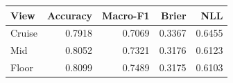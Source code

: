 \begin{tabular}{lrrrr}
\toprule
View & Accuracy & Macro-F1 & Brier & NLL \\
\midrule
Cruise & 0.7918 & 0.7069 & 0.3367 & 0.6455 \\
Mid & 0.8052 & 0.7321 & 0.3176 & 0.6123 \\
Floor & 0.8099 & 0.7489 & 0.3175 & 0.6103 \\
\bottomrule
\end{tabular}
